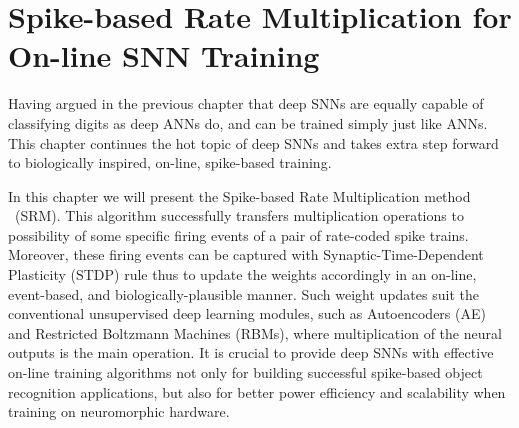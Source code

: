 \chapter{Spike-based Rate Multiplication for On-line SNN Training}
\label{cha:sdlm}
Having argued in the previous chapter that deep SNNs are equally capable of classifying digits as deep ANNs do, and can be trained simply just like ANNs.
This chapter continues the hot topic of deep SNNs and takes extra step forward to biologically inspired, on-line, spike-based training.

In this chapter we will present the Spike-based Rate Multiplication method ~(SRM).
This algorithm successfully transfers multiplication operations to possibility of some specific firing events of a pair of rate-coded spike trains.
Moreover, these firing events can be captured with Synaptic-Time-Dependent Plasticity (STDP) rule thus to update the weights accordingly in an on-line, event-based, and biologically-plausible manner.
Such weight updates suit the conventional unsupervised deep learning modules, such as Autoencoders (AE) and Restricted Boltzmann Machines (RBMs), where multiplication of the neural outputs is the main operation.
It is crucial to provide deep SNNs with effective on-line training algorithms not only for building successful spike-based object recognition applications, but also for better power efficiency and scalability when training on neuromorphic hardware.


